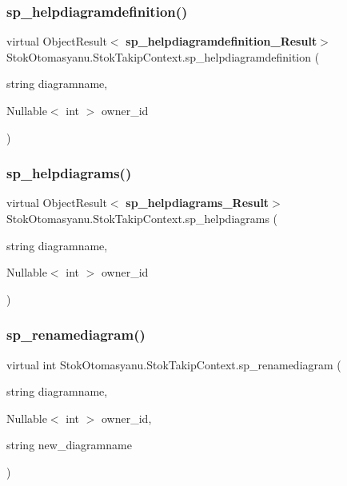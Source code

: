 \subsubsection{sp\+\_\+helpdiagramdefinition()}
{\footnotesize\ttfamily virtual Object\+Result$<$\textbf{ sp\+\_\+helpdiagramdefinition\+\_\+\+Result}$>$ Stok\+Otomasyanu.\+Stok\+Takip\+Context.\+sp\+\_\+helpdiagramdefinition (\begin{DoxyParamCaption}\item[{string}]{diagramname,  }\item[{Nullable$<$ int $>$}]{owner\+\_\+id }\end{DoxyParamCaption})\hspace{0.3cm}{\ttfamily [virtual]}}

\mbox{\label{class_stok_otomasyanu_1_1_stok_takip_context_a564f5c457fe4a1c4ffe3900e725cd341}} 
\subsubsection{sp\+\_\+helpdiagrams()}
{\footnotesize\ttfamily virtual Object\+Result$<$\textbf{ sp\+\_\+helpdiagrams\+\_\+\+Result}$>$ Stok\+Otomasyanu.\+Stok\+Takip\+Context.\+sp\+\_\+helpdiagrams (\begin{DoxyParamCaption}\item[{string}]{diagramname,  }\item[{Nullable$<$ int $>$}]{owner\+\_\+id }\end{DoxyParamCaption})\hspace{0.3cm}{\ttfamily [virtual]}}

\mbox{\label{class_stok_otomasyanu_1_1_stok_takip_context_a6a3dab5c670bdf2b9a1bfc635d8d9ea4}} 
\subsubsection{sp\+\_\+renamediagram()}
{\footnotesize\ttfamily virtual int Stok\+Otomasyanu.\+Stok\+Takip\+Context.\+sp\+\_\+renamediagram (\begin{DoxyParamCaption}\item[{string}]{diagramname,  }\item[{Nullable$<$ int $>$}]{owner\+\_\+id,  }\item[{string}]{new\+\_\+diagramname }\end{DoxyParamCaption})\hspace{0.3cm}{\ttfamily [virtual]}}

